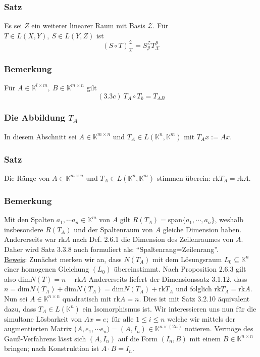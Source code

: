 \subsubsection{Satz}
Es sei $Z$ ein weiterer linearer Raum mit Basis $\mathcal{Z}$.  Für $T\in L(X,Y),\ S\in L(Y,Z)$ ist
\[ (S\circ T)_\mathcal{X}^\mathcal{Z}=S_\mathcal{Y}^\mathcal{Z}T_\mathcal{X}^\mathcal{Y}\]
\subsubsection{Bemerkung}
Für $A\in\mathbb{K}^{l\times m},\ B\in\mathbb{K}^{m\times n}$ gilt
\[(3.3c)\ T_A\circ T_b=T_{AB}\]
\addtocounter{subsubsection}{-6}
\subsubsection{Die Abbildung $T_A$}
In diesem Abschnitt sei $A\in\mathbb{K}^{m\times n}$ und $T_A\in L(\mathbb{K}^n,\mathbb{K}^m)$ mit $T_Ax:=Ax$.
\addtocounter{subsubsection}{5}
\subsubsection{Satz}
Die Ränge von $A\in\mathbb{K}^{m\times n}$ und $T_A\in L(\mathbb{K}^n,\mathbb{K}^m)$ stimmen überein: rk$T_A=$rk$A$.
\subsubsection{Bemerkung}
Mit den Spalten $a_1,\cdots a_n\in \mathbb{K}^m$ von $A$ gilt $R(T_A)=$span$\{a_1,\cdots ,a_n\}$, weshalb insbesondere $R(T_A)$ und der Spaltenraum von $A$ gleiche Dimension haben.  Andererseits war rk$A$ nach Def. 2.6.1 die Dimension des Zeilenraumes von $A$.  Daher wird Satz 3.3.8 auch formuliert als: "`Spaltenrang=Zeilenrang"'.\\
\underline{Beweis}: Zunächst merken wir an, dass $N(T_A)$ mit dem Lösungsraum $L_0\subseteq \mathbb{K}^n$ einer homogenen Gleichung $(L_0)$ übereinstimmt.  Nach Proposition 2.6.3 gilt also dim$N(T)=n-$rk$A$ Andererseits liefert der Dimensionssatz 3.1.12, dass $n=\mathrm{dim}N(T_A)+\mathrm{dim}N(T_A)=\mathrm{dim}N(T_A)+\mathrm{rk}T_A$ und folglich $\mathrm{rk}T_A=\mathrm{rk}A$.\\
Nun sei $A\in\mathbb{K}^{n\times n}$ quadratisch mit rk$A=n$.  Dies ist mit Satz 3.2.10 äquivalent dazu, dass $T_A\in L(\mathbb{K}^n)$ ein Isomorphismus ist.  Wir interessieren uns nun für die simultane Lösbarkeit von
$Ax=e;\text{ für alle } 1\leq i\leq n$ welche wir mittels der augmentierten Matrix ($A,e_1,\cdots e_n)=(A,I_n)\in \mathbb{K}^{n\times (2n)}$ notieren.  Vermöge des Gauß-Verfahrens lässt sich $(A,I_n)$ auf die Form $(I_n,B)$ mit einem $B\in\mathbb{K}^{n\times n}$ bringen; nach Konstruktion ist $A\cdot B=I_n$.
